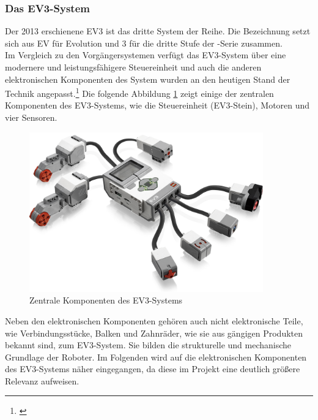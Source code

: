 \subsubsection{Das EV3-System}
Der 2013 erschienene EV3 ist das dritte System der \LM{} Reihe. Die Bezeichnung setzt sich aus EV für Evolution 
und 3 für die dritte Stufe der \LM{}-Serie zusammen. \\
Im Vergleich zu den Vorgängersystemen verfügt das EV3-System über eine modernere und leistungsfähigere Steuereinheit und auch die anderen elektronischen Komponenten des System wurden an den heutigen Stand der Technik 
angepasst.\footnote{\citep[vgl.][Das EV3 Roboter Universum, Seite 22]{Scholz.DasEV3}\label{note24}}
\medskip
\newline
Die folgende Abbildung \ref{fig:ev3system} zeigt einige der zentralen Komponenten des EV3-Systems, wie die Steuereinheit (EV3-Stein), Motoren und vier Sensoren.
\begin{figure}[ht]
	\centering
	\includegraphics[width=0.90\textwidth]{images/technische_grundlagen/EV3-Overview.png}
	\caption[Zentrale Komponenten des EV3-Systems]{Zentrale Komponenten des EV3-Systems}
	\label{fig:ev3system}
\end{figure}
\newline
Neben den elektronischen Komponenten gehören auch nicht elektronische Teile, wie Verbindungsstücke, Balken und Zahnräder, wie sie aus gängigen \LE{} Produkten bekannt sind, zum EV3-System. Sie bilden die strukturelle und mechanische Grundlage der Roboter.
\medskip
\newline
Im Folgenden wird auf die elektronischen Komponenten des EV3-Systems näher eingegangen, da diese im Projekt eine deutlich größere Relevanz aufweisen.
